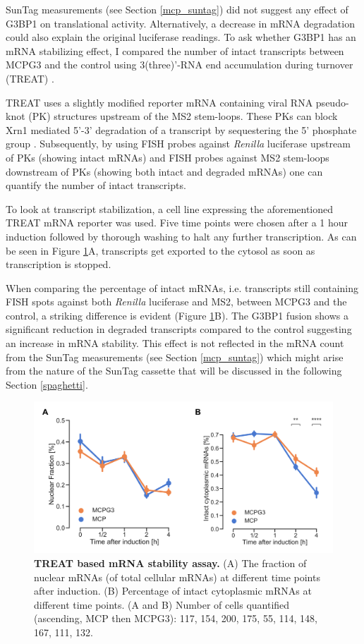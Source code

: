 SunTag measurements (see Section \ref{mcp_suntag}) did not suggest any effect of G3BP1 on translational activity.
Alternatively, a decrease in mRNA degradation could also explain the original luciferase readings.
To ask whether G3BP1 has an mRNA stabilizing effect, I compared the number of intact transcripts between MCPG3 and the control using 3(three)'-RNA end accumulation during turnover (TREAT) \cite{horvathova_dynamics_2017}.

TREAT uses a slightly modified reporter mRNA containing viral RNA pseudo-knot (PK) structures upstream of the MS2 stem-loops.
These PKs can block Xrn1 mediated 5'-3' degradation of a transcript by sequestering the 5' phosphate group \cite{kieft_new_2015}.
Subsequently, by using FISH probes against \textit{Renilla} luciferase upstream of PKs (showing intact mRNAs) and FISH probes against MS2 stem-loops downstream of PKs (showing both intact and degraded mRNAs) one can quantify the number of intact transcripts.

To look at transcript stabilization, a cell line expressing the aforementioned TREAT mRNA reporter was used.
Five time points were chosen after a 1 hour induction followed by thorough washing to halt any further transcription.
As can be seen in Figure \ref{fig:mcp_treat}A, transcripts get exported to the cytosol as soon as transcription is stopped.

When comparing the percentage of intact mRNAs, i.e. transcripts still containing FISH spots against both \textit{Renilla} luciferase and MS2, between MCPG3 and the control, a striking difference is evident (Figure \ref{fig:mcp_treat}B).
The G3BP1 fusion shows a significant reduction in degraded transcripts compared to the control suggesting an increase in mRNA stability.
This effect is not reflected in the mRNA count from the SunTag measurements (see Section \ref{mcp_suntag}) which might arise from the nature of the SunTag cassette that will be discussed in the following Section \ref{spaghetti}.


\begin{figure}[h]
    \centering
    \includegraphics[width=\linewidth]{images/figure5}
    \caption{\textbf{TREAT based mRNA stability assay.}
        (A) The fraction of nuclear mRNAs (of total cellular mRNAs)
            at different time points after induction.
        (B) Percentage of intact cytoplasmic mRNAs at different time points.
        (A and B) Number of cells quantified (ascending, MCP then MCPG3):
            117, 154, 200, 175, 55, 114, 148, 167, 111, 132.
    }
    \label{fig:mcp_treat}
\end{figure}


